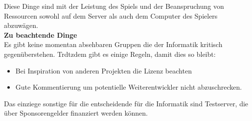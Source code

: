 \documentclass[11pt,a4paper]{article}
\begin{document}
Diese Dinge sind mit der Leistung des Spiels und der Beanspruchung von Ressourcen sowohl auf dem Server als auch dem Computer des Spielers abzuwägen.
\bigskip \\
{\large \bf Zu beachtende Dinge}
\smallskip \\
Es gibt keine momentan absehbaren Gruppen die der Informatik kritisch gegenüberstehen. Trdtzdem gibt es einige Regeln, damit dies so bleibt:
\begin{itemize}
\item Bei Inspiration von anderen Projekten die Lizenz beachten
\item Gute Kommentierung um potentielle Weiterentwickler nicht abzuschrecken.
\end{itemize}
Das einziege sonstige für die entscheidende für die Informatik sind Testserver, die über Sponsorengelder finanziert werden können.
\end{document}
